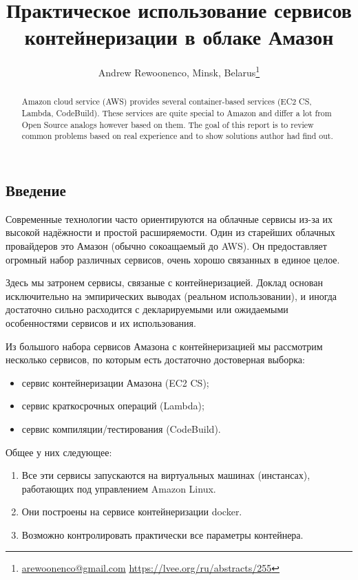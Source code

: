 \documentclass[10pt, a5paper]{article}
\begin{document}
\title{Практическое использование сервисов контейнеризации в облаке Амазон}
\author{Andrew Rewoonenco, Minsk, Belarus\footnote{\url{arewoonenco@gmail.com} \url{https://lvee.org/ru/abstracts/255}}}
\maketitle
\begin{abstract}
Amazon cloud service (AWS) provides several container-based services (EC2 CS, Lambda, CodeBuild). These services are quite special to Amazon and differ a lot from Open Source analogs however based on them. The goal of this report is to review common problems based on real experience and to show solutions author had find out.
\end{abstract}

\subsection*{Введение}
Современные технологии часто ориентируются на облачные сервисы из-за их
высокой надёжности и простой расширяемости. Один из старейших облачных
провайдеров это Амазон (обычно сокоащаемый до AWS). Он предоставляет
огромный набор различных сервисов, очень хорошо связанных в единое целое.

Здесь мы затронем сервисы, связаные с контейнеризацией.
Доклад основан исключительно на эмпирических выводах (реальном
использовании), и иногда достаточно сильно расходится с декларируемыми или
ожидаемыми особенностями сервисов и их использования.

Из большого набора сервисов Амазона с контейнеризацией мы рассмотрим
несколько сервисов, по которым есть достаточно достоверная выборка:

\begin{itemize}
\item сервис контейнеризации Амазона (EC2 CS);
\item сервис краткосрочных операций (Lambda);
\item сервис компиляции/тестирования (CodeBuild).
\end{itemize}

Общее у них следующее:

\begin{enumerate}
\item Все эти сервисы запускаются на виртуальных машинах (инстансах), работающих под управлением Amazon Linux.
\item Они построены на сервисе контейнеризации docker.
\item Возможно контролировать практически все параметры контейнера.
\end{enumerate}
\end{document}
